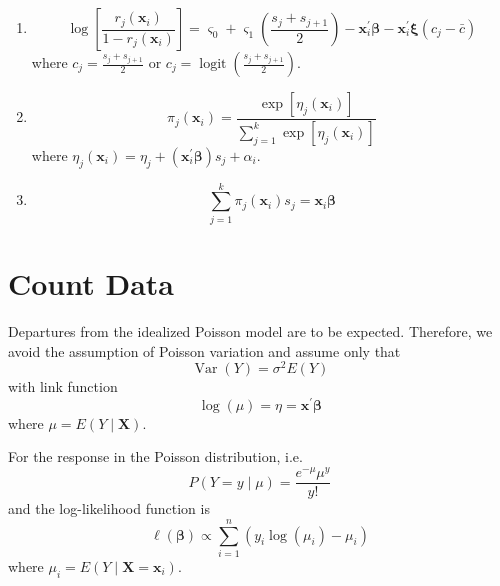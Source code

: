 \begin{enumerate}
	\item \begin{equation}
		      \log\left[\frac{r_{j}\left(\mathbf{x}_{i}\right)}{1-r_{j}\left(\mathbf{x}_{i}\right)}\right]=\varsigma_{0}+\varsigma_{1}\left(\frac{s_{j}+s_{j+1}}{2}\right)-\mathbf{x}_{i}^{\prime}\boldsymbol{\beta}-\mathbf{x}_{i}^{\prime}\boldsymbol{\xi}\left(c_{j}-\bar{c}\right)
	      \end{equation}
	      where $c_{j}=\frac{s_{j}+s_{j+1}}{2}$ or $c_{j}=\operatorname{logit}\left(\frac{s_{j}+s_{j+1}}{2}\right)$.
	\item \begin{equation}
		      \pi_{j}\left(\mathbf{x}_{i}\right)=\frac{\exp \left[\eta_{j}\left(\mathbf{x}_{i}\right)\right]}{\sum_{j=1}^{k} \exp \left[\eta_{j}\left(\mathbf{x}_{i}\right)\right]}
	      \end{equation}
	      where $\eta_{j}\left(\mathbf{x}_{i}\right)=\eta_{j}+\left(\mathbf{x}_{i}^{\prime}\boldsymbol{\beta}\right)s_{j}+\alpha_{i}$.
	\item \begin{equation}
		      \sum_{j=1}^{k}\pi_{j}\left(\mathbf{x}_{i}\right)s_{j}=\mathbf{x}_{i}\boldsymbol{\beta}
	      \end{equation}
\end{enumerate}

\section{Count Data}

Departures from the idealized Poisson model are to be expected. Therefore, we avoid the assumption of Poisson variation and assume only that
\begin{equation}
	\operatorname{Var}\left(Y\right)=\sigma^{2}E\left(Y\right)
\end{equation}
with link function
\begin{equation}
	\log\left(\mu\right)=\eta=\mathbf{x}^{\prime}\boldsymbol{\beta}
\end{equation}
where $\mu=E\left(Y\mid\mathbf{X}\right)$.

For the response in the Poisson distribution, i.e.
\begin{equation*}
	P(Y=y\mid\mu)=\frac{e^{-\mu}\mu^{y}}{y!}
\end{equation*}
and the log-likelihood function is
\begin{equation}
	\ell\left(\boldsymbol{\beta}\right)\propto\sum_{i=1}^{n}\left(y_{i} \log\left(\mu_{i}\right)-\mu_{i}\right)
\end{equation}
where $\mu_{i}=E\left(Y\mid\mathbf{X}=\mathbf{x}_{i}\right)$.
